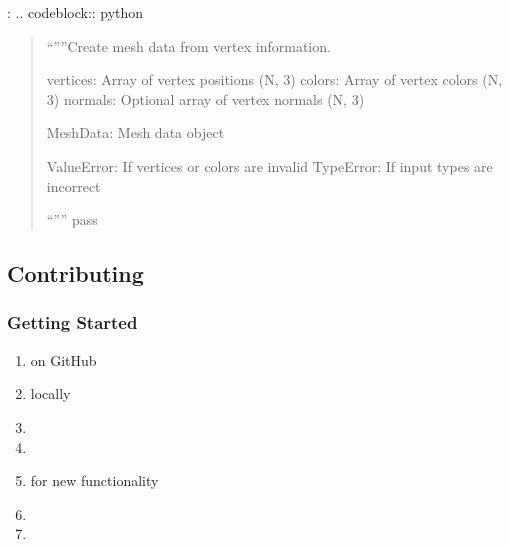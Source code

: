\documentclass[a4paper,10pt,english,openany,oneside]{sphinxmanual}
\begin{document}
\sphinxAtStartPar
{}:
.. code\sphinxhyphen{}block:: python
\begin{quote}
\begin{description}
\sphinxAtStartPar
“””Create mesh data from vertex information.
\begin{description}
\sphinxAtStartPar
vertices: Array of vertex positions (N, 3)
colors: Array of vertex colors (N, 3)
normals: Optional array of vertex normals (N, 3)

\sphinxAtStartPar
MeshData: Mesh data object

\sphinxAtStartPar
ValueError: If vertices or colors are invalid
TypeError: If input types are incorrect

\end{description}

\sphinxAtStartPar
“””
pass

\end{description}
\end{quote}


\subsection{Contributing}
\label{\detokenize{development:contributing}}

\subsubsection{Getting Started}
\label{\detokenize{development:getting-started}}\begin{enumerate}
%
\item {} 
\sphinxAtStartPar
{} on GitHub

\item {} 
\sphinxAtStartPar
{} locally

\item {} 
\sphinxAtStartPar
{}

\item {} 
\sphinxAtStartPar
{}

\item {} 
\sphinxAtStartPar
{} for new functionality

\item {} 
\sphinxAtStartPar
{}

\item {} 
\sphinxAtStartPar
{}

\end{enumerate}
\end{document}
